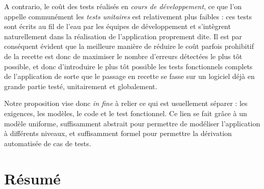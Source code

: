 A contrario, le co\^ut des tests r\'ealis\'es en \emph{cours de
  d\'eveloppement}, ce que l'on appelle commun\'ement les
\emph{tests unitaires} est relativement plus faibles : ces tests
sont \'ecrits au fil de l'eau par les \'equipes de
d\'eveloppement et s'int\`egrent naturellement dans la
r\'ealisation de l'application proprement dite. Il est par cons\'equent
\'evident que la meilleure mani\`ere de r\'eduire le co\^ut
parfois prohibitif de la recette est donc de maximiser le nombre
d'erreurs d\'etect\'ees le plus t\^ot possible, et donc
  d'introduire le plus t\^ot possible les tests fonctionnels complets
  de l'application de sorte que le passage en recette se fasse sur un
  logiciel d\'ej\`a en grande partie test\'e, unitairement et
  globalement.
 
Notre proposition vise donc \emph{in fine} \`a relier ce qui est usuellement
s\'eparer : les exigences, les mod\`eles, le code et le test
fonctionnel. Ce lien se fait gr\^ace \`a un mod\`ele uniforme, suffisamment abstrait
pour permettre de mod\'eliser l'application \`a diff\'erents
niveaux, et suffisamment formel pour permettre la d\'erivation
automatis\'ee de cas de tests. 

\section*{R\'esum\'e}

